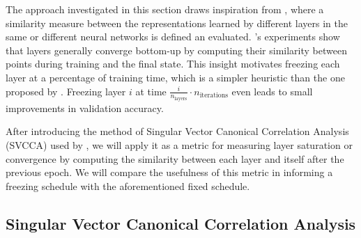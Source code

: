 The approach investigated in this section draws inspiration from
\citep{raghu2017svcca}, where a similarity measure between the representations
learned by different layers in the same or different neural networks is defined
an evaluated. \citeauthor{raghu2017svcca}'s experiments show that layers
generally converge bottom-up by computing their similarity between points during
training and the final state. This insight motivates freezing each layer at a
percentage of training time, which is a simpler heuristic than the one proposed
by \citeauthor{brock2017freezeout}. Freezing layer $i$ at time
$\frac{i}{n_\text{layers}} \cdot n_\text{iterations}$ even leads to small improvements
in validation accuracy.

After introducing the method of Singular Vector Canonical Correlation Analysis
(SVCCA) used by \citeauthor{raghu2017svcca}, we will apply it as a metric for
measuring layer saturation or convergence by computing the similarity between
each layer and itself after the previous epoch. We will compare the usefulness
of this metric in informing a freezing schedule with the aforementioned fixed
schedule.

\subsection{Singular Vector Canonical Correlation Analysis}%
\label{sub:singular_vector_canonical_correlation_analysis}

